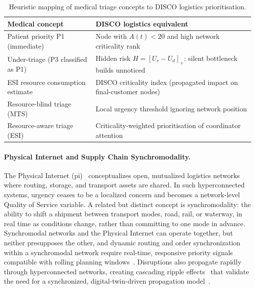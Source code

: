 \begin{table}[H]
\centering
\caption{Heuristic mapping of medical triage concepts to DISCO logistics prioritisation.}
\label{tab:triage_transfer}
\begin{tabularx}{\linewidth}{lX}
\toprule
\textbf{Medical concept} & \textbf{DISCO logistics equivalent} \\
\midrule
Patient priority P1 (immediate) & Node with $A(t) < 20$ and high network criticality rank \\
Under-triage (P3 classified as P1) & Hidden risk $H = [U_r - U_d]_+$: silent bottleneck builds unnoticed \\
ESI resource consumption estimate & DISCO criticality index (propagated impact on final-customer nodes) \\
Resource-blind triage (MTS) & Local urgency threshold ignoring network position \\
Resource-aware triage (ESI) & Criticality-weighted prioritisation of coordinator attention \\
\bottomrule
\end{tabularx}
\end{table}
\paragraph{Physical Internet and Supply Chain Synchromodality.}
The Physical Internet (\gls{pi})~\autocite{montreuil2011toward} conceptualizes open, mutualized logistics networks where routing, storage, and transport assets are shared. In such hyperconnected systems, urgency ceases to be a localized concern and becomes a network-level Quality of Service variable. A related but distinct concept is synchromodality: the ability to shift a shipment between transport modes, road, rail, or waterway, in real time as conditions change, rather than committing to one mode in advance. Synchromodal networks and the Physical Internet can operate together, but neither presupposes the other, and dynamic routing and order synchronization within a synchromodal network require real-time, responsive priority signals compatible with rolling planning windows~\autocite{guo2020dynamic}. Disruptions also propagate rapidly through hyperconnected networks, creating cascading ripple effects~\autocite{li2020exploring} that validate the need for a synchronized, digital-twin-driven propagation model~\autocite{ivanov2020digital}.

